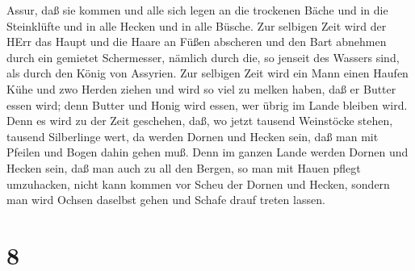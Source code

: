 Assur,  daß sie kommen und alle sich legen an die trockenen
Bäche und in die Steinklüfte und in alle Hecken und in alle Büsche.
 Zur selbigen Zeit wird der HErr das Haupt und die Haare an
Füßen abscheren und den Bart abnehmen durch ein gemietet Schermesser,
nämlich durch die, so jenseit des Wassers sind, als durch den König von
Assyrien.  Zur selbigen Zeit wird ein Mann einen Haufen
Kühe und zwo Herden ziehen  und wird so viel zu melken
haben, daß er Butter essen wird; denn Butter und Honig wird essen, wer
übrig im Lande bleiben wird.  Denn es wird zu der Zeit
geschehen, daß, wo jetzt tausend Weinstöcke stehen, tausend Silberlinge
wert, da werden Dornen und Hecken sein,  daß man mit
Pfeilen und Bogen dahin gehen muß. Denn im ganzen Lande werden Dornen
und Hecken sein,  daß man auch zu all den Bergen, so man
mit Hauen pflegt umzuhacken, nicht kann kommen vor Scheu der Dornen und
Hecken, sondern man wird Ochsen daselbst gehen und Schafe drauf treten
lassen.

\hypertarget{section-7}{%
\section{8}\label{section-7}}

